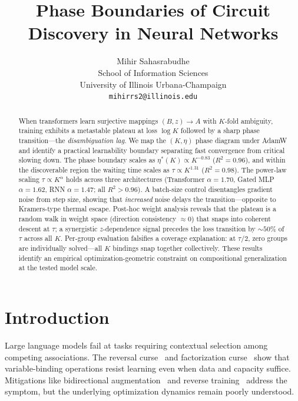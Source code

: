 \documentclass{article}
\title{Phase Boundaries of Circuit Discovery in Neural Networks}
\author{
  Mihir Sahasrabudhe \\
  School of Information Sciences \\
  University of Illinois Urbana-Champaign \\
  \texttt{mihirrs2@illinois.edu}
}
\begin{document}
\maketitle

\begin{abstract}
When transformers learn surjective mappings $(B, z) \to A$ with $K$-fold ambiguity, training exhibits a metastable plateau at loss $\log K$ followed by a sharp phase transition---the \emph{disambiguation lag}.
We map the $(K, \eta)$ phase diagram under AdamW and identify a practical learnability boundary separating fast convergence from critical slowing down.
The phase boundary scales as $\eta^*(K) \propto K^{-0.83}$ ($R^2 = 0.96$), and within the discoverable region the waiting time scales as $\tau \propto K^{1.31}$ ($R^2 = 0.98$).
The power-law scaling $\tau \propto K^\alpha$ holds across three architectures (Transformer $\alpha{=}1.70$, Gated MLP $\alpha{=}1.62$, RNN $\alpha{=}1.47$; all $R^2 {>} 0.96$).
A batch-size control disentangles gradient noise from step size, showing that \emph{increased} noise delays the transition---opposite to Kramers-type thermal escape.
Post-hoc weight analysis reveals that the plateau is a random walk in weight space (direction consistency ${\approx}0$) that snaps into coherent descent at $\tau$; a synergistic $z$-dependence signal precedes the loss transition by ${\sim}50\%$ of $\tau$ across all $K$.
Per-group evaluation falsifies a coverage explanation: at $\tau/2$, zero groups are individually solved---all $K$ bindings snap together collectively.
These results identify an empirical optimization-geometric constraint on compositional generalization at the tested model scale.
\end{abstract}


\section{Introduction}

Large language models fail at tasks requiring contextual selection among competing associations.
The reversal curse~\citep{berglund2024reversal} and factorization curse~\citep{kitouni2024factorization} show that variable-binding operations resist learning even when data and capacity suffice.
Mitigations like bidirectional augmentation~\citep{lv2024bico} and reverse training~\citep{golovneva2024reverse} address the symptom, but the underlying optimization dynamics remain poorly understood.
\end{document}

